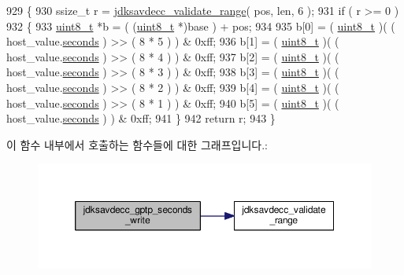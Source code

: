 \begin{DoxyCode}
929 \{
930     ssize\_t r = \hyperlink{group__util_ga9c02bdfe76c69163647c3196db7a73a1}{jdksavdecc\_validate\_range}( pos, len, 6 );
931     \textcolor{keywordflow}{if} ( r >= 0 )
932     \{
933         \hyperlink{stdint_8h_aba7bc1797add20fe3efdf37ced1182c5}{uint8\_t} *b = ( (\hyperlink{stdint_8h_aba7bc1797add20fe3efdf37ced1182c5}{uint8\_t} *)base ) + pos;
934 
935         b[0] = ( \hyperlink{stdint_8h_aba7bc1797add20fe3efdf37ced1182c5}{uint8\_t} )( ( host\_value.\hyperlink{structjdksavdecc__gptp__seconds_aae1213f8226839b7226bcbfb6f1e568d}{seconds} ) >> ( 8 * 5 ) ) & 0xff;
936         b[1] = ( \hyperlink{stdint_8h_aba7bc1797add20fe3efdf37ced1182c5}{uint8\_t} )( ( host\_value.\hyperlink{structjdksavdecc__gptp__seconds_aae1213f8226839b7226bcbfb6f1e568d}{seconds} ) >> ( 8 * 4 ) ) & 0xff;
937         b[2] = ( \hyperlink{stdint_8h_aba7bc1797add20fe3efdf37ced1182c5}{uint8\_t} )( ( host\_value.\hyperlink{structjdksavdecc__gptp__seconds_aae1213f8226839b7226bcbfb6f1e568d}{seconds} ) >> ( 8 * 3 ) ) & 0xff;
938         b[3] = ( \hyperlink{stdint_8h_aba7bc1797add20fe3efdf37ced1182c5}{uint8\_t} )( ( host\_value.\hyperlink{structjdksavdecc__gptp__seconds_aae1213f8226839b7226bcbfb6f1e568d}{seconds} ) >> ( 8 * 2 ) ) & 0xff;
939         b[4] = ( \hyperlink{stdint_8h_aba7bc1797add20fe3efdf37ced1182c5}{uint8\_t} )( ( host\_value.\hyperlink{structjdksavdecc__gptp__seconds_aae1213f8226839b7226bcbfb6f1e568d}{seconds} ) >> ( 8 * 1 ) ) & 0xff;
940         b[5] = ( \hyperlink{stdint_8h_aba7bc1797add20fe3efdf37ced1182c5}{uint8\_t} )( ( host\_value.\hyperlink{structjdksavdecc__gptp__seconds_aae1213f8226839b7226bcbfb6f1e568d}{seconds} ) ) & 0xff;
941     \}
942     \textcolor{keywordflow}{return} r;
943 \}
\end{DoxyCode}


이 함수 내부에서 호출하는 함수들에 대한 그래프입니다.\+:
\nopagebreak
\begin{figure}[H]
\begin{center}
\leavevmode
\includegraphics[width=350pt]{group__gptp_gaabc83320ff2c1115d44e531158ce59a4_cgraph}
\end{center}
\end{figure}


